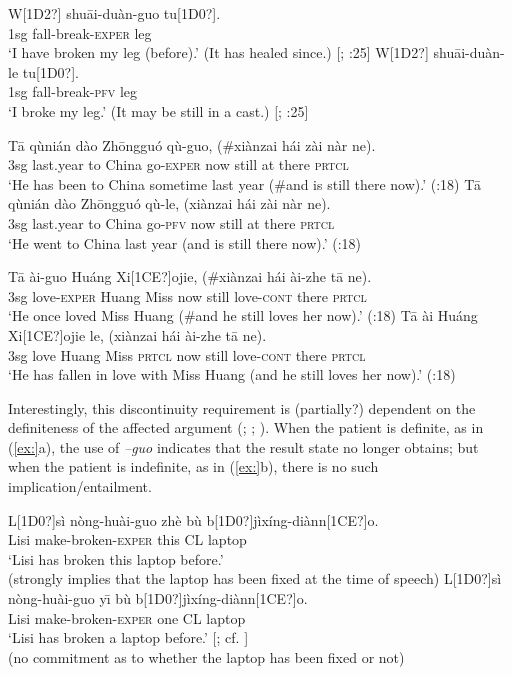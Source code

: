 \ea
\ea  \gll W[1D2?]  shu\=ai-duàn-guo  tu[1D0?].\\
1sg  fall-break-\textsc{exper}  leg\\
\glt ‘I have broken my leg (before).’ (It has healed since.) [\citealt{Chao1968}; \citealt{Ma1977}:25]
\ex \gll W[1D2?]  shu\=ai-duàn-le  tu[1D0?].\\
1sg  fall-break-\textsc{pfv}  leg\\
\glt ‘I broke my leg.’  (It may be still in a cast.)  [\citealt{Chao1968}; \citealt{Ma1977}:25]
\z \z

\ea
\ea \gll T\=a  qùnián  dào  Zh\=ongguó  qù-guo,  (\#xiànzai  hái  zài  nàr  ne).\\
3sg  last.year  to  China  go-\textsc{exper}    now  still  at  there  \textsc{prtcl}\\
\glt ‘He has been to China sometime last year (\#and is still there now).’  (\citealt{Ma1977}:18)
\ex \gll  T\=a  qùnián  dào  Zh\=ongguó  qù-le,  (xiànzai  hái  zài  nàr  ne).\\
3sg  last.year  to  China  go-\textsc{pfv} now  still  at  there  \textsc{prtcl}\\
\glt ‘He went to China last year (and is still there now).’  (\citealt{Ma1977}:18)
\z \z

\ea
\ea \gll  T\=a  ài-guo  Huáng  Xi[1CE?]ojie,  (\#xiànzai  hái  ài-zhe  t\=a  ne).\\
3sg  love-\textsc{exper}  Huang  Miss now  still  love-\textsc{cont}  there  \textsc{prtcl}\\
\glt ‘He once loved Miss Huang (\#and he still loves her now).’  (\citealt{Ma1977}:18)
\ex \gll  T\=a  ài  Huáng  Xi[1CE?]ojie  le,  (xiànzai  hái  ài-zhe  t\=a  ne).\\
3sg  love  Huang  Miss \textsc{prtcl} now  still  love-\textsc{cont}  there  \textsc{prtcl}\\
\glt ‘He has fallen in love with Miss Huang (and he still loves her now).’  (\citealt{Ma1977}:18)
\z \z


Interestingly, this discontinuity requirement is (partially?) dependent on the definiteness of the affected argument (\citealt{Lin2007}; \citealt{Wu2008}; \citealt{Chen2009}). When the patient is definite, as in (\ref{ex:}a), the use of \textit{–guo} indicates that the result state no longer obtains; but when the patient is indefinite, as in (\ref{ex:}b), there is no such implication/entailment.


\ea
\ea  \gll L[1D0?]sì  nòng-huài-guo  zhè  bù  b[1D0?]jìxíng-diànn[1CE?]o.\\
Lisi  make-broken-\textsc{exper}  this  CL  laptop\\
\glt ‘Lisi has broken this laptop before.’\\
(strongly implies that the laptop has been fixed at the time of speech)
\ex \gll  L[1D0?]sì  nòng-huài-guo  y\={\i}  bù  b[1D0?]jìxíng-diànn[1CE?]o.\\
Lisi  make-broken-\textsc{exper}  one  CL  laptop\\
\glt ‘Lisi has broken a laptop before.’  [\citealt{Chen2009}; cf. \citealt{Lin2007}]\\
(no commitment as to whether the laptop has been fixed or not)
\z \z


